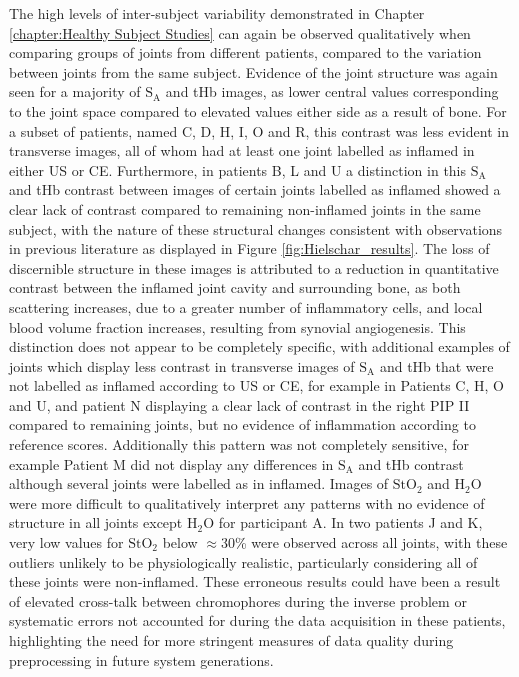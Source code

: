 \documentclass[twoside]{bhamthesis}
\theoremstyle{definition}
\begin{document}
The high levels of inter-subject variability demonstrated in Chapter \ref{chapter:Healthy Subject Studies} can again be observed qualitatively when comparing groups of joints from different patients, compared to the variation between joints from the same subject. Evidence of the joint structure was again seen for a majority of $\mathrm{S_A}$ and tHb images, as lower central values corresponding to the joint space compared to elevated values either side as a result of bone. For a subset of patients, named C, D, H, I, O and R, this contrast was less evident in transverse images, all of whom had at least one joint labelled as inflamed in either US or CE. Furthermore, in patients B, L and U a distinction in this $\mathrm{S_A}$ and tHb contrast between images of certain joints labelled as inflamed showed a clear lack of contrast compared to remaining non-inflamed joints in the same subject, with the nature of these structural changes consistent with observations in previous literature \cite{montejo2013computer} as displayed in Figure \ref{fig:Hielschar_results}. The loss of discernible structure in these images is attributed to a reduction in quantitative contrast between the inflamed joint cavity and surrounding bone, as both scattering increases, due to a greater number of inflammatory cells, and local blood volume fraction increases, resulting from synovial angiogenesis. This distinction does not appear to be completely specific, with additional examples of joints which display less contrast in transverse images of $\mathrm{S_A}$ and tHb that were not labelled as inflamed according to US or CE, for example in Patients C, H, O and U, and patient N displaying a clear lack of contrast in the right PIP II compared to remaining joints, but no evidence of inflammation according to reference scores. Additionally this pattern was not completely sensitive, for example Patient M did not display any differences in $\mathrm{S_A}$ and tHb contrast although several joints were labelled as in inflamed. Images of $\mathrm{StO_2}$ and $\mathrm{H_2O}$ were more difficult to qualitatively interpret any patterns with no evidence of structure in all joints except $\mathrm{H_2O}$ for participant A. In two patients J and K, very low values for $\mathrm{StO_2}$ below $\approx$30\% were observed across all joints, with these outliers unlikely to be physiologically realistic, particularly considering all of these joints were non-inflamed. These erroneous results could have been a result of elevated cross-talk between chromophores during the inverse problem or systematic errors not accounted for during the data acquisition in these patients, highlighting the need for more stringent measures of data quality during preprocessing in future system generations.
\end{document}

